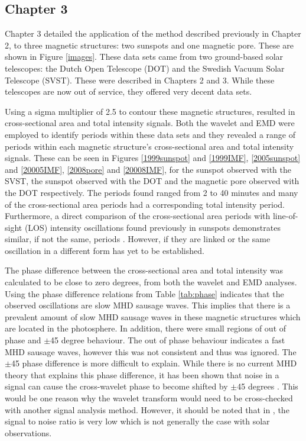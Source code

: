   	\subsection{Chapter 3}
    	
    Chapter 3 detailed the application of the method described previously in Chapter 2, to three magnetic structures: two sunspots and one magnetic pore.
    These are shown in Figure \ref{images}.
    These data sets came from two ground-based solar telescopes: the Dutch Open Telescope (DOT) and the Swedish Vacuum Solar Telescope (SVST). 
    These were described in Chapters 2 and 3.
    While these telescopes are now out of service, they offered very decent data sets.
    
    Using a sigma multiplier of 2.5 to contour these magnetic structures, resulted in cross-sectional area and total intensity signals.
    Both the wavelet and EMD were employed to identify periods within these data sets and they revealed a range of periods within each magnetic structure's cross-sectional area and total intensity signals.
    These can be seen in Figures \ref{1999sunspot} and \ref{1999IMF}, \ref{2005sunspot} and \ref{20005IMF}, \ref{2008pore} and \ref{20008IMF}, for the sunspot observed with the SVST, the sunspot observed with the DOT and the magnetic pore observed with the DOT respectively.
    The periods found ranged from 2 to 40 minutes and many of the cross-sectional area periods had a corresponding total intensity period.
    Furthermore, a direct comparison of the cross-sectional area periods with line-of-sight (LOS) intensity oscillations found previously in sunspots demonstrates similar, if not the same, periods \cite{kobanov}.
    However, if they are linked or the same oscillation in a different form has yet to be established.
   
    The phase difference between the cross-sectional area and total intensity was calculated to be close to zero degrees, from both the wavelet and EMD analyses.
    Using the phase difference relations from Table \ref{tab:phase} indicates that the observed oscillations are slow MHD sausage waves. 
    This implies that there is a prevalent amount of slow MHD sausage waves in these magnetic structures which are located in the photosphere.
    In addition, there were small regions of out of phase and $\pm$45 degree behaviour.
    The out of phase behaviour indicates a fast MHD sausage waves, however this was not consistent and thus was ignored. 
    The $\pm$45 phase difference is more difficult to explain.
    While there is no current MHD theory that explains this phase difference, it has been shown that noise in a signal can cause the cross-wavelet phase to become shifted by $\pm$45 degrees \citep{2015A&A...579A..73M}.
    This would be one reason why the wavelet transform would need to be cross-checked with another signal analysis method.
    However, it should be noted that in \cite{2015A&A...579A..73M}, the signal to noise ratio is very low which is not generally the case with solar observations. 
    
